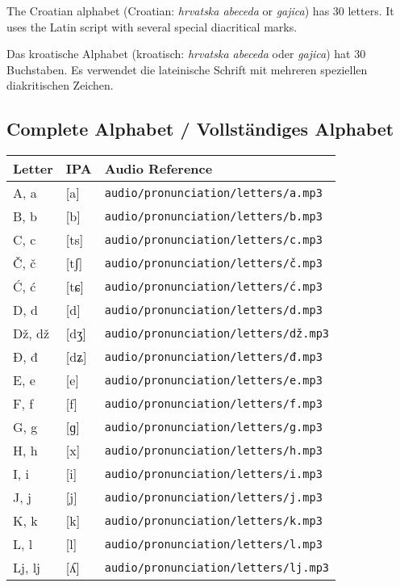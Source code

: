The Croatian alphabet (Croatian: \textit{hrvatska abeceda} or \textit{gajica}) has 30 letters. It uses the Latin script with several special diacritical marks.

Das kroatische Alphabet (kroatisch: \textit{hrvatska abeceda} oder \textit{gajica}) hat 30 Buchstaben. Es verwendet die lateinische Schrift mit mehreren speziellen diakritischen Zeichen.

\subsection{Complete Alphabet / Vollständiges Alphabet}

\begin{center}
\begin{tabular}{lll}
\toprule
\textbf{Letter} & \textbf{IPA} & \textbf{Audio Reference} \\
\midrule
A, a & [a] & \texttt{audio/pronunciation/letters/a.mp3} \\
B, b & [b] & \texttt{audio/pronunciation/letters/b.mp3} \\
C, c & [ts] & \texttt{audio/pronunciation/letters/c.mp3} \\
Č, č & [tʃ] & \texttt{audio/pronunciation/letters/č.mp3} \\
Ć, ć & [tɕ] & \texttt{audio/pronunciation/letters/ć.mp3} \\
D, d & [d] & \texttt{audio/pronunciation/letters/d.mp3} \\
Dž, dž & [dʒ] & \texttt{audio/pronunciation/letters/dž.mp3} \\
Đ, đ & [dʑ] & \texttt{audio/pronunciation/letters/đ.mp3} \\
E, e & [e] & \texttt{audio/pronunciation/letters/e.mp3} \\
F, f & [f] & \texttt{audio/pronunciation/letters/f.mp3} \\
G, g & [ɡ] & \texttt{audio/pronunciation/letters/g.mp3} \\
H, h & [x] & \texttt{audio/pronunciation/letters/h.mp3} \\
I, i & [i] & \texttt{audio/pronunciation/letters/i.mp3} \\
J, j & [j] & \texttt{audio/pronunciation/letters/j.mp3} \\
K, k & [k] & \texttt{audio/pronunciation/letters/k.mp3} \\
L, l & [l] & \texttt{audio/pronunciation/letters/l.mp3} \\
Lj, lj & [ʎ] & \texttt{audio/pronunciation/letters/lj.mp3} \\

\end{tabular}
\end{center}
